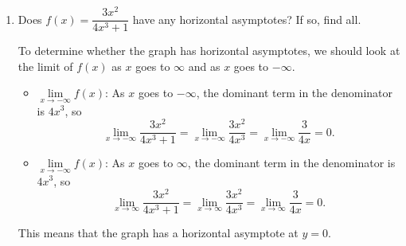 \documentclass{article}
\begin{document}
\begin{enumerate}
  \begin{solution}
    We determined that $\displaystyle \lim_{x \to -\infty} f(x) = \lim_{x \to \infty} f(x) = \tfrac{3}{4}$,
    and this matches graph (C). The graph of $f$ has a horizontal asymptote at $y=\frac{3}{4}$.
    
    We determined that $\lim\limits_{x \to -\infty} g(x) = \infty$ and 
    $\lim\limits_{x \to \infty} g(x) = -\infty$, and this matches graph (B). The graph of $f$ has no
    horizontal asymptotes.
  \end{solution}

\item 
  \begin{problem}[\nstretch{1.75}]
    Does $f(x) = \dfrac{3x^2}{4x^3 + 1}$ have any horizontal asymptotes? If so, find all. 
  \end{problem}

  \begin{solution}
    To determine whether the graph has horizontal asymptotes, we should look at the limit of $f(x)$ as $x$
    goes to $\infty$ and as $x$ goes to $-\infty$.

    \begin{itemize}
      \item $\lim\limits_{x \to -\infty} f(x)$: As $x$ goes to $-\infty$, the dominant term in the 
      denominator is $4x^3$, so 
      \[
        \lim_{x \to -\infty} \frac{3x^2}{4x^3+1} = \lim_{x \to -\infty} \frac{3x^2}{4x^3} = 
        \lim_{x \to -\infty} \frac{3}{4x} = 0.
      \]
      \item $\lim\limits_{x \to -\infty} f(x)$: As $x$ goes to $\infty$, the dominant term in the 
      denominator is $4x^3$, so 
      \[
        \lim_{x \to \infty} \frac{3x^2}{4x^3+1} = \lim_{x \to \infty} \frac{3x^2}{4x^3} = 
        \lim_{x \to \infty} \frac{3}{4x} = 0.
      \]
    \end{itemize}
    This means that the graph has a horizontal asymptote at $y=0$. 
  \end{solution}


\end{enumerate}
\end{document}
